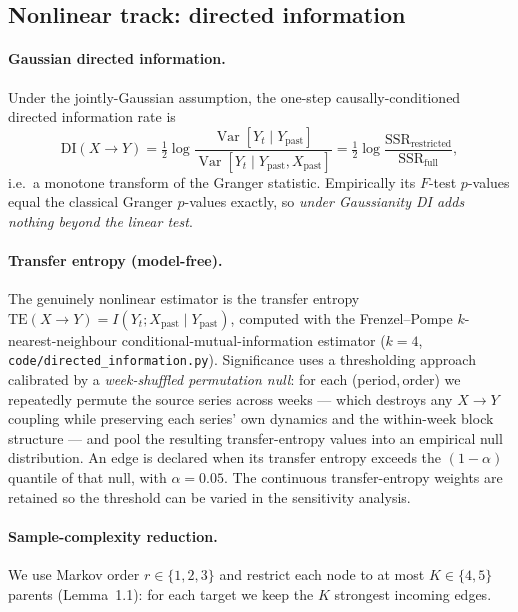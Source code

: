 \documentclass[11pt,a4paper]{article}
\begin{document}
\subsection{Nonlinear track: directed information}
\paragraph{Gaussian directed information.}
Under the jointly-Gaussian assumption, the one-step causally-conditioned directed
information rate is
\begin{equation}
\mathrm{DI}(X\!\to\!Y)=\tfrac12\log\frac{\operatorname{Var}[Y_t\mid Y_{\text{past}}]}{\operatorname{Var}[Y_t\mid Y_{\text{past}},X_{\text{past}}]}
= \tfrac12\log\frac{\mathrm{SSR}_{\text{restricted}}}{\mathrm{SSR}_{\text{full}}},
\end{equation}
i.e.\ a monotone transform of the Granger statistic. Empirically its $F$-test
$p$-values equal the classical Granger $p$-values exactly, so \emph{under
Gaussianity DI adds nothing beyond the linear test}.

\paragraph{Transfer entropy (model-free).}
The genuinely nonlinear estimator is the transfer entropy
$\mathrm{TE}(X\!\to\!Y)=I(Y_t;X_{\text{past}}\mid Y_{\text{past}})$, computed with
the Frenzel--Pompe $k$-nearest-neighbour conditional-mutual-information estimator
($k=4$, \texttt{code/directed\_information.py}). Significance uses a thresholding
approach calibrated by a \emph{week-shuffled permutation null}: for each
(period,\,order) we repeatedly permute the source series across weeks --- which
destroys any $X\!\to\!Y$ coupling while preserving each series' own dynamics and
the within-week block structure --- and pool the resulting transfer-entropy values
into an empirical null distribution. An edge is declared when its transfer entropy
exceeds the $(1-\alpha)$ quantile of that null, with $\alpha=0.05$. The continuous
transfer-entropy weights are retained so the threshold can be varied in the
sensitivity analysis.

\paragraph{Sample-complexity reduction.}
We use Markov order $r\in\{1,2,3\}$ and restrict each node to at most $K\in\{4,5\}$
parents (Lemma~1.1): for each target we keep the $K$ strongest incoming edges.
\end{document}
